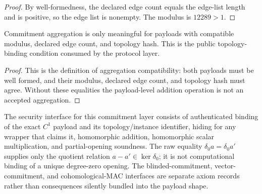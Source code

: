 \begin{proof}
  By well-formedness, the declared edge count equals the edge-list length and
  is positive, so the edge list is nonempty. The modulus is \(12289>1\).
\end{proof}

\begin{proposition}\label{prop:topology-compatible-aggregation}
  Commitment aggregation is only meaningful for payloads with compatible
  modulus, declared edge count, and topology hash. This is the public
  topology-binding condition consumed by the protocol layer.
\end{proposition}

\begin{proof}
  This is the definition of aggregation compatibility: both payloads must be
  well formed, and their modulus, declared edge count, and topology hash must
  agree. Without these equalities the payload-level addition operation is not
  an accepted aggregation.
\end{proof}

The security interface for this commitment layer consists of authenticated
binding of the exact \(C^1\) payload and its topology/instance identifier,
hiding for any wrapper that claims it, homomorphic addition, homomorphic scalar
multiplication, and partial-opening soundness. The raw equality
\(\delta_0a=\delta_0a'\) supplies only the quotient relation
\(a-a'\in\ker\delta_0\); it is not computational binding of a unique
degree-zero opening. The blinded-commitment, vector-commitment, and
cohomological-MAC interfaces are separate axiom records rather than consequences
silently bundled into the payload shape.

